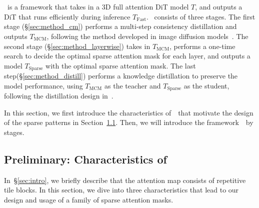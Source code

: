 \section{\methodname~}

\methodname~is a framework that takes in a 3D full attention DiT model $T$, and outputs a DiT that runs efficiently during inference $T_{\text{Fast}}$. \methodname~consists of three stages. The first stage (\S\ref{sec:method_cm}) performs a multi-step consistency distillation and outputs $T_{\text{MCM}}$, following the method developed in image diffusion models~\citep{xie2024mlcm}. The second stage (\S\ref{sec:method_layerwise}) takes in $T_{\text{MCM}}$, performs a one-time search to decide the optimal sparse attention mask for each layer, and outputs a model $T_{\text{Sparse}}$ with the optimal sparse attention mask. The last step(\S\ref{sec:method_distill}) performs a knowledge distillation to preserve the model performance, using $T_{\text{MCM}}$ as the teacher and $T_{\text{Sparse}}$ as the student, following the distillation design in~\citep{gu2024minillm, jiao2019tinybert}. 

In this section, we first introduce the characteristics of~\patternname~that motivate the design of the sparse patterns in Section~\ref{sec:char}. Then, we will introduce the framework~\methodname~by stages.


\subsection{Preliminary: Characteristics of~\patternname~}
\label{sec:char}
In~\S\ref{sec:intro}, we briefly describe that the attention map consists of repetitive tile blocks. In this section, we dive into three characteristics that lead to our design and usage of a family of sparse attention masks.

